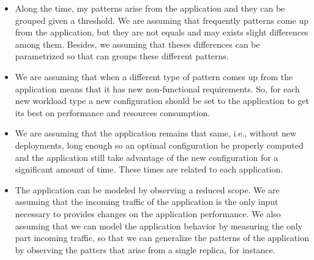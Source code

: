 \begin{itemize}
\item Along the time, my patterns arise from the application and they can be grouped given a threshold. We are assuming
that frequently patterns come up from the application, but they are not equals and may exists slight differences among
them. Besides, we assuming that theses differences can be parametrized so that \name can groups these different
patterns.

\item We are assuming that when a different type of pattern comes up from the application means that it has new
non-functional requirements. So, for each new workload type a new configuration should be set to the application to
get its best on performance and resources consumption.

\item We are assuming that the application remains that same, i.e., without new deployments, long enough so an optimal
configuration be properly computed and the application still take advantage of the new configuration for a significant
amount of time. These times are related to each application.

\item The application can be modeled by observing a reduced scope. We are assuming that the incoming traffic of the
application is the only input necessary to provides changes on the application performance. We also assuming that we
can model the application behavior by measuring the only part incoming traffic, so that we can generalize the patterns
of the application by observing the patters that arise from a single replica, for instance.

\end{itemize}

